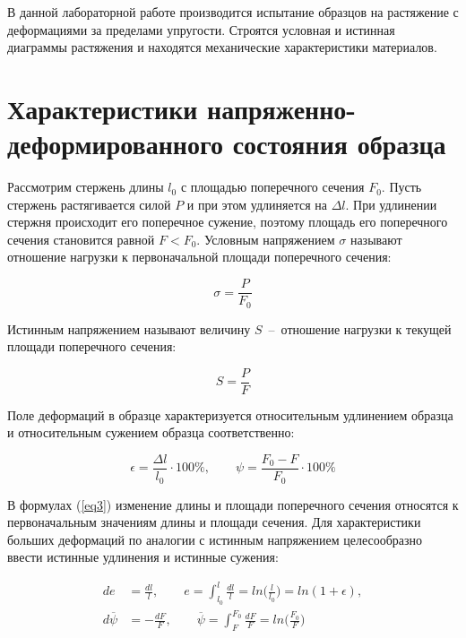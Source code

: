 \documentclass[12pt, a4paper]{article}
\begin{document}
    В данной лабораторной работе производится испытание образцов на растяжение с деформациями за пределами упругости. Строятся условная и истинная диаграммы растяжения и находятся механические характеристики материалов.
    
    \section{Характеристики напряженно-деформированного состояния образца}
    
    Рассмотрим стержень длины $l_{0}$ с площадью поперечного сечения $F_{0}$. Пусть стержень растягивается силой $P$ и при этом удлиняется на $\Delta l$. При удлинении стержня происходит его поперечное сужение, поэтому площадь его поперечного сечения становится равной $F < F_{0}$. Условным напряжением $\sigma$ называют отношение нагрузки к первоначальной площади поперечного сечения:
    
    \begin{equation}
        \sigma = \frac{P}{F_{0}}
        \label{eq1}
    \end{equation}
    
    Истинным напряжением называют величину $S$~--~отношение нагрузки к текущей площади поперечного сечения:
    
    \begin{equation}
        S = \frac{P}{F}
        \label{eq2}
    \end{equation}
    
    Поле деформаций в образце характеризуется относительным удлинением образца и относительным сужением образца соответственно:
    
    \begin{equation}
        \epsilon = \frac{\Delta l}{l_{0}} \cdot 100 \%, \qquad
        \psi = \frac{F_{0} - F}{F_{0}} \cdot 100 \%
        \label{eq3}
    \end{equation}
    
    В формулах (\ref{eq3}) изменение длины и площади поперечного сечения относятся к первоначальным значениям длины и площади сечения. Для характеристики больших деформаций по аналогии с истинным напряжением целесообразно ввести истинные удлинения и истинные сужения:
    
    \begin{equation}
        \begin{aligned}
            de &= \frac{dl}{l}, \qquad e = \int_{l_{0}}^{l} \frac{dl}{l} = ln \Big (\frac{l}{l_{0}} \Big ) = ln(1 + \epsilon), \\
            d\overline{\psi} &= -\frac{dF}{F}, \qquad \overline{\psi} = \int_{F}^{F_{0}} \frac{dF}{F} = ln \Big (\frac{F_{0}}{F} \Big )
        \end{aligned}
        \label{eq4}
    \end{equation}
    
\end{document}
